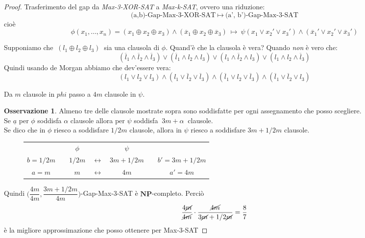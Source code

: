 \documentclass[a4paper]{article}
\theoremstyle{definition}
\newtheorem{obs}{Osservazione}[subsection]
\newcommand{\np}{\mathbf{NP}}
\begin{document}
	\begin{proof}
		Trasferimento del gap da \textit{Max-3-XOR-SAT} a \textit{Max-k-SAT}, ovvero una riduzione:
		\[
			\text{(a,b)-Gap-Max-3-XOR-SAT}\ \mapsto\ \text{(a', b')-Gap-Max-3-SAT}
		\]
		cioè
		\[
			\phi(x_1, \dots, x_n) = (x_1\oplus x_2\oplus x_3)\wedge(\overline{x}_1\oplus x_2\oplus \overline{x}_3)\ \mapsto\
			\psi(x_1\vee x_2'\vee x_3')\wedge(\overline{x}_1'\vee x_2'\vee \overline{x}_3')
		\]
		
		\begin{figure}[h!]
			\centering
		\end{figure}
		
		\noindent
		Supponiamo che $ \ (l_1\oplus l_2\oplus l_3)\ $ sia una clausola di $ \phi $. Quand'è che la clausola è vera? Quando \textit{non} è vero che:
		\[
			(\overline{l}_1\wedge \overline{l}_2\wedge\overline{l}_3)\vee(\overline{l}_1\wedge l_2\wedge l_3)\vee(l_1\wedge \overline{l}_2\wedge l_3)\vee(l_1\wedge l_2\wedge\overline{l}_3)
		\]
		Quindi usando de Morgan abbiamo che dev'essere vera:
		\[
			(l_1\vee l_2\vee l_3)\wedge(l_1\vee \overline{l}_2\vee \overline{l}_3)\wedge(\overline{l}_1\vee l_2\vee \overline{l}_3)\wedge(\overline{l}_1\vee \overline{l}_2\vee l_3)
		\]
		
		Da $ m $ clausole in $ phi $ passo a $ 4m $ clausole in $ \psi $.
		
		\begin{obs}
			Almeno tre delle clausole mostrate sopra sono soddisfatte per ogni assegnamento che posso scegliere.\\
			Se $ \underline{a} $ per $ \phi $ soddisfa $ \alpha $ clausole allora per $ \psi $ soddisfa $\ 3m + \alpha\ $ clausole.\\
			Se dico che in $ \phi $ riesco a soddisfare $ 1/2 m $ clausole, allora in $ \psi $ riesco a soddisfare $ 3m + 1/2m $ clausole.
		\end{obs}
		\begin{figure}[h!]
			\centering
			\begin{tabular}{c|ccccc|c}
			             & & $ \phi $ &                         & $ \psi $      & & \\
			$ b = 1/2m $ & & $ 1/2m $ & $ \longleftrightarrow $ & $ 3m + 1/2m $ & & $ b'= 3m + 1/2m $\\
			$ a = m $    & & $ m $ & $ \longleftrightarrow $ & $ 4m $ & & $ a'= 4m $
			\end{tabular}
		\end{figure}
		
		Quindi $ \Big(\dfrac{4m}{4m}, \dfrac{3m + 1/2m}{4m} \Big)$-Gap-Max-3-SAT è $ \np$-completo. Perciò
		\[
			\dfrac{4\cancel{m}}{\cancel{4m}}\cdot\dfrac{\cancel{4m}}{3\cancel{m} + 1/2\cancel{m}} = \dfrac{8}{7}
		\]
		è la migliore approssimazione che posso ottenere per Max-3-SAT
	\end{proof}
	
\end{document}
